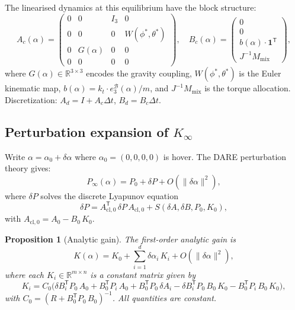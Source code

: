 \documentclass[11pt]{article}
\newtheorem{proposition}[theorem]{Proposition}
\newcommand{\R}{\mathbb{R}}
\newcommand{\norm}[1]{\|#1\|}
\newcommand{\trans}{\mathsf{T}}
\begin{document}
The linearised dynamics at this equilibrium have
the block structure:
\begin{equation}\label{eq:A-explicit}
  A_c(\alpha) =
  \begin{pmatrix}
    0 & 0 & I_3 & 0 \\
    0 & 0 & 0 & W(\phi^*, \theta^*) \\
    0 & G(\alpha) & 0 & 0 \\
    0 & 0 & 0 & 0
  \end{pmatrix}\!,
  \quad
  B_c(\alpha) =
  \begin{pmatrix}
    0 \\ 0 \\ b(\alpha) \cdot \mathbf{1}^\trans \\ J^{-1} M_{\text{mix}}
  \end{pmatrix}\!,
\end{equation}
where $G(\alpha) \in \R^{3\times 3}$ encodes
the gravity coupling,
$W(\phi^*,\theta^*)$ is the Euler kinematic map,
$b(\alpha) = k_t \cdot e_3^{\mathcal{B}}(\alpha)/m$,
and $J^{-1}M_{\text{mix}}$ is the torque allocation.
Discretization: $A_d = I + A_c \Delta t$,
$B_d = B_c \Delta t$.

\subsection{Perturbation expansion of $K_\infty$}

Write $\alpha = \alpha_0 + \delta\alpha$
where $\alpha_0 = (0, 0, 0, 0)$ is hover.
The DARE perturbation theory gives:
\begin{equation}\label{eq:dP}
  P_\infty(\alpha)
  = P_0 + \delta P + O(\norm{\delta\alpha}^2),
\end{equation}
where $\delta P$ solves the discrete Lyapunov equation
\begin{equation}\label{eq:lyap}
  \delta P
  = A_{\mathrm{cl},0}^\trans\, \delta P\,
    A_{\mathrm{cl},0}
  + S(\delta A, \delta B, P_0, K_0),
\end{equation}
with $A_{\mathrm{cl},0} = A_0 - B_0\, K_0$.

\begin{proposition}[Analytic gain]
\label{prop:analytic-gain}
The first-order analytic gain is
\begin{equation}\label{eq:K-analytic}
  K(\alpha) = K_0
  + \sum_{i=1}^{d} \delta\alpha_i\, K_i
  + O(\norm{\delta\alpha}^2),
\end{equation}
where each $K_i \in \R^{m \times n}$
is a constant matrix given by
\begin{equation}\label{eq:Ki}
  K_i = C_0\bigl(
    \delta B_i^\trans P_0\, A_0
    + B_0^\trans P_i\, A_0
    + B_0^\trans P_0\, \delta A_i
    - \delta B_i^\trans P_0\, B_0\, K_0
    - B_0^\trans P_i\, B_0\, K_0
  \bigr),
\end{equation}
with $C_0 = (R + B_0^\trans P_0\, B_0)^{-1}$.
All quantities are constant.
\end{proposition}
\end{document}
